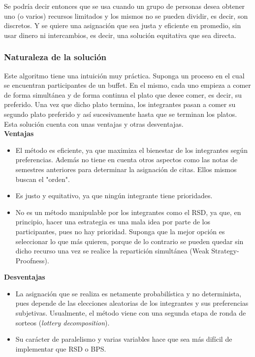 \documentclass{article}
\begin{document}
Se podría decir entonces que se usa cuando un grupo de personas desea obtener uno (o varios) 
recursos limitados y los mismos no se pueden dividir, es decir, son discretos. Y se quiere una 
asignación que sea justa y eficiente en promedio, sin usar dinero ni intercambios, es decir, una 
solución equitativa que sea directa.

\subsubsection{Naturaleza de la solución}

Este algoritmo tiene una intuición muy práctica. Suponga un proceso en el cual se encuentran 
participantes de un buffet. En el mismo, cada uno empieza a comer de forma simultánea y de 
forma continua el plato que desee comer, es decir, su preferido. Una vez que dicho plato termina,
los integrantes pasan a comer su segundo plato preferido y así sucesivamente hasta que se terminan 
los platos.\\

Esta solución cuenta con unas ventajas y otras desventajas.\\

\textbf{Ventajas}

\begin{itemize}
  \item El método es eficiente, ya que maximiza el bienestar de los integrantes según preferencias.
  Además no tiene en cuenta otros aspectos como las notas de semestres anteriores para determinar la
  asignación de citas.
        Ellos mismos buscan el "orden".
  \item Es justo y equitativo, ya que ningún integrante tiene prioridades.
  \item No es un método manipulable por los integrantes como el RSD, ya que, en principio, hacer una 
        estrategia es una mala idea por parte de los participantes, pues no hay prioridad. Suponga que
        la mejor opción es seleccionar lo que más quieren, porque de lo contrario se pueden quedar sin 
        dicho recurso una vez se realice la repartición simultánea (Weak Strategy-Proofness).
\end{itemize}

\textbf{Desventajas}

\begin{itemize}
  \item La asignación que se realiza es netamente probabilística y no determinista, pues depende 
        de las elecciones aleatorias de los integrantes y sus preferencias subjetivas. Usualmente, el
        método viene con una segunda etapa de ronda de sorteos (\textit{lottery decomposition}).
  \item Su carácter de paralelismo y varias variables hace que sea más difícil de implementar que
        RSD o BPS.
\end{itemize}
\end{document}
